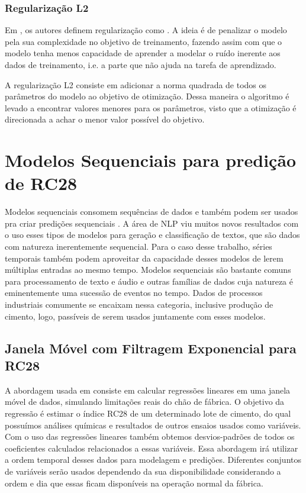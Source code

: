 \subsubsection{Regularização L2}

Em \cite{dlbook}, os autores definem regularização como . A ideia é de penalizar o modelo pela sua
complexidade no objetivo de treinamento, fazendo assim com que o modelo tenha menos capacidade de aprender a modelar o ruído inerente
aos dados de treinamento, i.e. a parte que não ajuda na tarefa de aprendizado. 

A regularização L2 consiste em adicionar a norma quadrada de todos os parâmetros
do modelo ao objetivo de otimização. Dessa maneira o algoritmo é levado a
encontrar valores menores para os parâmetros, visto que a otimização é
direcionada a achar o menor valor possível do objetivo.



\section{Modelos Sequenciais para predição de RC28}

Modelos sequenciais consomem sequências de dados e também podem ser usados pra
criar predições sequenciais \citep{dlbook}. A área de NLP viu muitos novos
resultados com o uso esses tipos de modelos para geração e classificação de textos, que são dados com
natureza inerentemente sequencial. Para o caso desse trabalho, séries temporais também podem
aproveitar da capacidade desses modelos de lerem múltiplas entradas ao mesmo
tempo. Modelos sequenciais são bastante comuns para processamento de texto e
áudio e outras famílias de dados cuja natureza é eminentemente uma sucessão de
eventos no tempo. Dados de processos industriais comumente se encaixam nessa
categoria, inclusive produção de cimento, logo, passíveis de serem usados
juntamente com esses modelos.



\subsection{Janela Móvel com Filtragem Exponencial para RC28 }
\label{ses:ewma}

A abordagem usada em \cite{grecialin} consiste em calcular regressões lineares em
uma janela móvel de dados, simulando limitações reais do chão de fábrica. O
objetivo da regressão é estimar o índice RC28 de um determinado lote de cimento,
do qual possuímos análises químicas e resultados de outros ensaios usados como
variáveis. Com o uso das regressões lineares também obtemos desvios-padrões de
todos os coeficientes calculados relacionados a essas variáveis. Essa abordagem irá utilizar a ordem temporal desses dados para
modelagem e predições. Diferentes conjuntos de variáveis serão usados dependendo
da sua disponibilidade considerando a ordem e dia que essas ficam disponíveis na
operação normal da fábrica.

